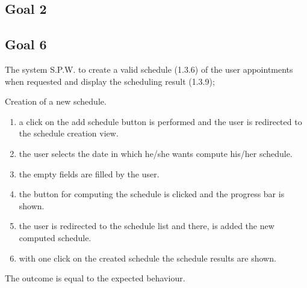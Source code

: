 

\subsection{Goal 2}

\subsection{Goal 6}

The system S.P.W. to create a valid schedule (1.3.6) of the user appointments when
requested and display the scheduling result (1.3.9);

{Creation of a new schedule.}
{{\begin{enumerate}
\item a click on the add schedule button is performed and the user is redirected to the schedule creation view.
\item the user selects the date in which he/she wants compute his/her schedule.
\item the empty fields are filled by the user.
\item the button for computing the schedule is clicked and the progress bar is shown.
\item the user is redirected to the schedule list and there, is added the new computed schedule.
\item with one click on the created schedule the schedule results are shown.
\end{enumerate}}}
{The outcome is equal to the expected behaviour.}








